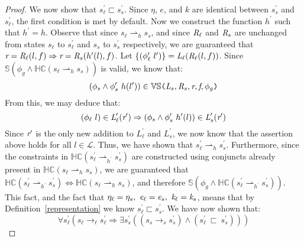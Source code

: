 \begin{proof}
We now show that $s_\ell^\prime \sqsubset s_s^\prime$. Since $\eta$, $e$, and $k$ are identical between $s_s^\prime$ and $s_\ell^\prime $, the first condition is met by default. Now we construct the function $h^\prime$ such that $h^\prime = h$. Observe that since $s_\ell \rightharpoonup_{h} s_s$, and since $\emph{R}_\ell$ and $\emph{R}_s$ are unchanged from states $s_\ell$ to $s_\ell^\prime$ and $s_s$ to $s_s^\prime$ respectively, we are guaranteed that $ \emph{r} = \emph{R}_\ell(l,f) \Rightarrow \emph{r} = \emph{R}_s(h^\prime(l),f)$. Let $\{(\phi_\ell^\prime\ l^\prime)\} =  \emph{L}_\ell(\emph{R}_\ell(l,f))$. Since $\mathbb{S}(\phi_g \wedge \mathbb{HC}(s_\ell \rightharpoonup_{h} s_s))$ is valid, we know that:
 $$(\phi_s \wedge \phi_s^\prime\ h(l^\prime)) \in \mathbb{VS}\texttt{(} \emph{L}_{s},\emph{R}_{s},\emph{r},\emph{f},\phi_g\texttt{)}$$ 
From this, we may deduce that:
$$ (\phi_\ell\ l) \in \emph{L}_\ell^\prime(\emph{r}^\prime) \Rightarrow (\phi_s \wedge \phi_s^\prime\ h^\prime(l))\in \emph{L}_s^\prime(\emph{r}^\prime)$$
Since $\emph{r}^\prime$ is the only new addition to $L_\ell^\prime$ and $L_s^\prime$, we now know that the assertion above holds for all $l \in \mathcal{L}$. Thus, we have shown that $s_\ell^\prime \rightharpoonup_{h} s_s^\prime$. Furthermore, since the constraints in $\mathbb{HC}(s_\ell^\prime \rightharpoonup_{h^\prime} s_s^\prime)$ are constructed using conjuncts already present in $ \mathbb{HC}(s_\ell \rightharpoonup_{h} s_s)$, we are guaranteed that $\mathbb{HC}(s_\ell^\prime \rightharpoonup_{h^\prime} s_s^\prime) \Leftrightarrow \mathbb{HC}(s_\ell \rightharpoonup_{h} s_s)$, and therefore $\mathbb{S}(\phi_g \wedge \mathbb{HC}(s_\ell^\prime \rightharpoonup_{h^\prime} s_s^\prime))$. This fact, and the fact that $\eta_{\ell} = \eta_{s} ,\ \emph{e}_{\ell} = \emph{e}_{s} ,\ \emph{k}_{\ell} = \emph{k}_{s}$, means that by Definition~\ref{representation} we know $s_\ell^\prime \sqsubset s_s^\prime$. We have now shown that:
\begin{equation}
\forall s_\ell^\prime ( s_\ell \rightarrow_\ell s_\ell^\prime \Rightarrow \exists s_s^\prime( (s_s \rightarrow_s s_s^\prime )\wedge (s_\ell^\prime\ \sqsubset\ s_s^\prime ))  )
\end{equation}



\end{proof}
